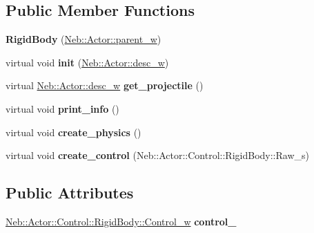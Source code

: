 \subsection*{\-Public \-Member \-Functions}
\begin{DoxyCompactItemize}
\item 
\hypertarget{classNeb_1_1Actor_1_1RigidBody_1_1RigidBody_a5a7032a278c85b233434d07053e259df}{{\bfseries \-Rigid\-Body} (\hyperlink{classNeb_1_1weak__ptr}{\-Neb\-::\-Actor\-::parent\-\_\-w})}\label{classNeb_1_1Actor_1_1RigidBody_1_1RigidBody_a5a7032a278c85b233434d07053e259df}

\item 
\hypertarget{classNeb_1_1Actor_1_1RigidBody_1_1RigidBody_adf46c095bd894c93b54b0ba5e14da762}{virtual void {\bfseries init} (\hyperlink{classNeb_1_1weak__ptr}{\-Neb\-::\-Actor\-::desc\-\_\-w})}\label{classNeb_1_1Actor_1_1RigidBody_1_1RigidBody_adf46c095bd894c93b54b0ba5e14da762}

\item 
\hypertarget{classNeb_1_1Actor_1_1RigidBody_1_1RigidBody_af2815897f5fbbfcf14617d95eed86275}{virtual \hyperlink{classNeb_1_1weak__ptr}{\-Neb\-::\-Actor\-::desc\-\_\-w} {\bfseries get\-\_\-projectile} ()}\label{classNeb_1_1Actor_1_1RigidBody_1_1RigidBody_af2815897f5fbbfcf14617d95eed86275}

\item 
\hypertarget{classNeb_1_1Actor_1_1RigidBody_1_1RigidBody_a5c25ce0493726ce917186750ebeb31a8}{virtual void {\bfseries print\-\_\-info} ()}\label{classNeb_1_1Actor_1_1RigidBody_1_1RigidBody_a5c25ce0493726ce917186750ebeb31a8}

\item 
\hypertarget{classNeb_1_1Actor_1_1RigidBody_1_1RigidBody_ada77ea4dabbcc6e4c68949d8d0065ff4}{virtual void {\bfseries create\-\_\-physics} ()}\label{classNeb_1_1Actor_1_1RigidBody_1_1RigidBody_ada77ea4dabbcc6e4c68949d8d0065ff4}

\item 
\hypertarget{classNeb_1_1Actor_1_1RigidBody_1_1RigidBody_a3b214f40b91461dc3d1082219c5e23fe}{virtual void {\bfseries create\-\_\-control} (\-Neb\-::\-Actor\-::\-Control\-::\-Rigid\-Body\-::\-Raw\-\_\-s)}\label{classNeb_1_1Actor_1_1RigidBody_1_1RigidBody_a3b214f40b91461dc3d1082219c5e23fe}

\end{DoxyCompactItemize}
\subsection*{\-Public \-Attributes}
\begin{DoxyCompactItemize}
\item 
\hypertarget{classNeb_1_1Actor_1_1RigidBody_1_1RigidBody_ad63689c6669d7dbb11f1121ea411faea}{\hyperlink{classNeb_1_1weak__ptr}{\-Neb\-::\-Actor\-::\-Control\-::\-Rigid\-Body\-::\-Control\-\_\-w} {\bfseries control\-\_\-}}\label{classNeb_1_1Actor_1_1RigidBody_1_1RigidBody_ad63689c6669d7dbb11f1121ea411faea}

\end{DoxyCompactItemize}
